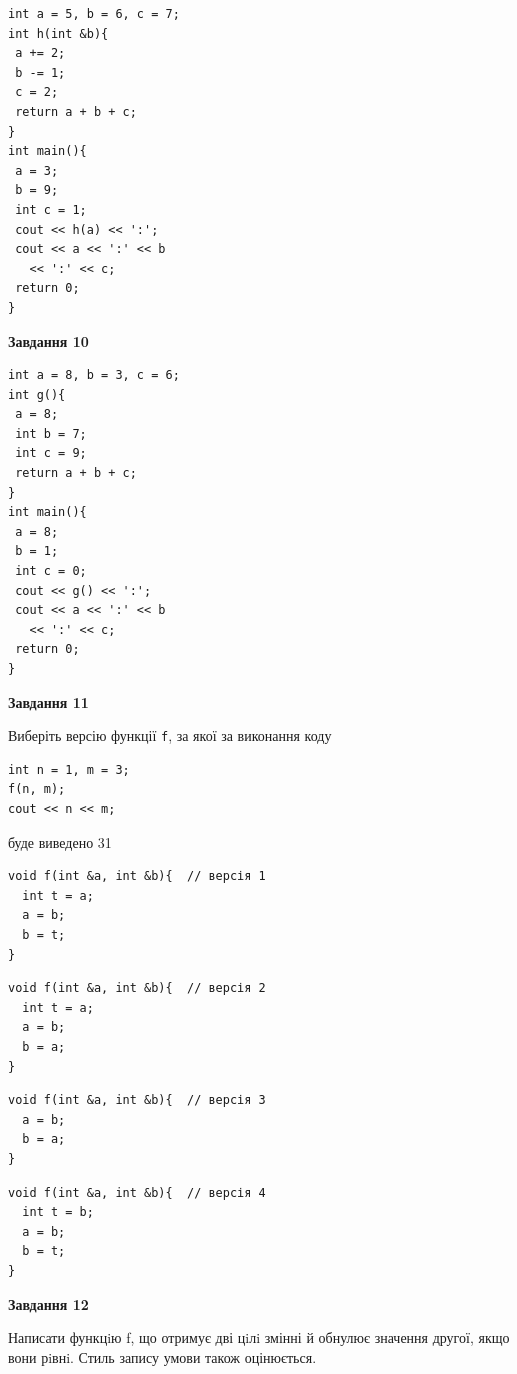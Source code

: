\documentclass[12pt, ukrainian]{article}
\def\code#1{\Verb!#1!}
\begin{document}
{\begin {large}
\begin{minipage}[t]{7.0cm}
\begin{verbatim}
int a = 5, b = 6, c = 7;
int h(int &b){
 a += 2;
 b -= 1;
 c = 2;
 return a + b + c;
}
int main(){
 a = 3;
 b = 9;
 int c = 1;
 cout << h(a) << ':';
 cout << a << ':' << b 
   << ':' << c;
 return 0;
}
\end{verbatim}



\begin{center}
\textbf{Завдання 10}
\end{center}
\vspace{-8mm}

\begin{verbatim}
int a = 8, b = 3, c = 6;
int g(){
 a = 8;
 int b = 7;
 int c = 9;
 return a + b + c;
}
int main(){
 a = 8;
 b = 1;
 int c = 0;
 cout << g() << ':';
 cout << a << ':' << b 
   << ':' << c;
 return 0;
}
\end{verbatim}

\end{minipage}
\vline \hspace{1mm}
\begin{minipage}[t]{11.0cm}

\begin{center}
\textbf{Завдання 11}
\end{center}
Виберіть версію функції \code{f}, за якої за виконання коду
\begin{verbatim}
int n = 1, m = 3;
f(n, m);
cout << n << m;
\end{verbatim}

буде виведено 31

\begin{verbatim}
void f(int &a, int &b){  // версія 1
  int t = a;
  a = b;
  b = t;
}
\end{verbatim}

\vspace{-8mm}\begin{verbatim}
void f(int &a, int &b){  // версія 2
  int t = a;
  a = b;
  b = a;
}
\end{verbatim}

\vspace{-8mm}\begin{verbatim}
void f(int &a, int &b){  // версія 3
  a = b;
  b = a;
}
\end{verbatim}

\vspace{-8mm}\begin{verbatim}
void f(int &a, int &b){  // версія 4
  int t = b;
  a = b;
  b = t;
}
\end{verbatim}



\begin{center}
\textbf{Завдання 12}
\end{center}

Написати функцiю f, що отримує дві цiлi змінні й обнулює значення другої, якщо вони рiвнi. Стиль запису умови також оцінюється.\par

\end{minipage}

\end {large}}
\newpage
\end{document}
